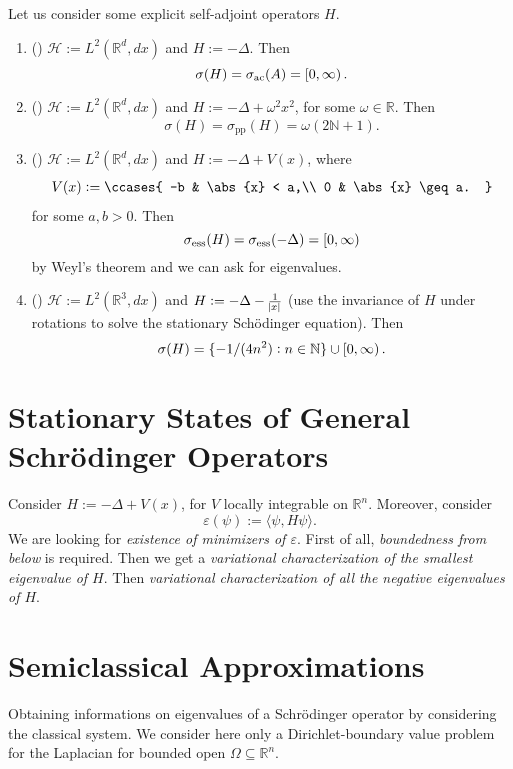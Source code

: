 \begin{examples}
	Let us consider some explicit self-adjoint operators $H$.
	\begin{enumerate}[label = \textup{(}\alph*\textup{)},wide = 0pt]
		\item () $\mathcal{H} := L^2(\mathbb{R}^d,dx)$ and $H := -\Delta$. Then
			\begin{equation*}
				\sigma(H) = \sigma_{\mathrm{ac}}(A) = \intco{0,\infty}.
			\end{equation*}
		\item () $\mathcal{H} := L^2(\mathbb{R}^d,dx)$ and $H := -\Delta + \omega^2x^2$, for some $\omega \in \mathbb{R}$. Then
			\begin{equation*}
				\sigma(H) = \sigma_{\mathrm{pp}}(H) = \omega(2 \mathbb{N} + 1).
			\end{equation*}
		\item () $\mathcal{H} := L^2(\mathbb{R}^d,dx)$ and $H := -\Delta + V(x)$, where
			\begin{align*}
				V(x) := \ccases{
					-b & \abs{x} < a,\\
					0 & \abs{x} \geq a.
				}
			\end{align*}
			\noindent for some $a,b > 0$. Then
			\begin{equation*}
				\sigma_{\mathrm{ess}}(H) = \sigma_{\mathrm{ess}}(-\Delta) = \intco{0,\infty}
			\end{equation*}
			\noindent by Weyl's theorem and we can ask for eigenvalues.
		\item () $\mathcal{H} := L^2(\mathbb{R}^3,dx)$ and $H := -\Delta - \frac{1}{\abs{x}}$ (use the invariance of $H$ under rotations to solve the stationary Sch\"odinger equation). Then
			\begin{equation*}
				\sigma(H) = \cbr[0]{-1/(4n^2) : n \in \mathbb{N}} \cup \intco{0,\infty}.
			\end{equation*}
	\end{enumerate}
\end{examples}

\section*{Stationary States of General Schr\"odinger Operators}
Consider $H := -\Delta + V(x)$, for $V$ locally integrable on $\mathbb{R}^n$. Moreover, consider 
\begin{equation*}
	\varepsilon(\psi) := \langle \psi,H\psi \rangle.
\end{equation*}
We are looking for \emph{existence of minimizers of $\varepsilon$}. First of all, \emph{boundedness from below} is required. Then we get a \emph{variational characterization of the smallest eigenvalue of $H$}. Then \emph{variational characterization of all the negative eigenvalues of $H$}. 

\section*{Semiclassical Approximations}

Obtaining informations on eigenvalues of a Schr\"odinger operator by considering the classical system. We consider here only a Dirichlet-boundary value problem for the Laplacian for bounded open $\Omega \subseteq \mathbb{R}^n$.
